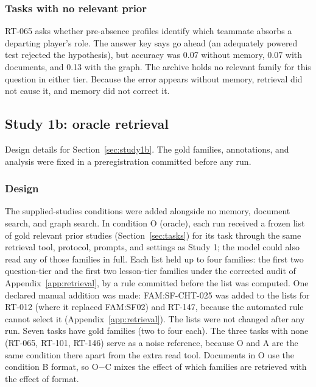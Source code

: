 \documentclass[11pt]{article}
\begin{document}
\subsubsection{Tasks with no relevant prior}

RT-065 asks whether pre-absence profiles identify which teammate absorbs a departing player's role. The answer key says go ahead (an adequately powered test rejected the hypothesis), but accuracy was 0.07 without memory, 0.07 with documents, and 0.13 with the graph. The archive holds no relevant family for this question in either tier. Because the error appears without memory, retrieval did not cause it, and memory did not correct it.


\subsection{Study 1b: oracle retrieval}

Design details for Section~\ref{sec:study1b}. The gold families, annotations, and analysis were fixed in a preregistration committed before any run.

\subsubsection{Design}

The supplied-studies conditions were added alongside no memory, document search, and graph search. In condition O (oracle), each run received a frozen list of gold relevant prior studies (Section~\ref{sec:tasks}) for its task through the same retrieval tool, protocol, prompts, and settings as Study 1; the model could also read any of those families in full. Each list held up to four families: the first two question-tier and the first two lesson-tier families under the corrected audit of Appendix~\ref{app:retrieval}, by a rule committed before the list was computed. One declared manual addition was made: FAM:SF-CHT-025 was added to the lists for RT-012 (where it replaced FAM:SF02) and RT-147, because the automated rule cannot select it (Appendix~\ref{app:retrieval}). The lists were not changed after any run. Seven tasks have gold families (two to four each). The three tasks with none (RT-065, RT-101, RT-146) serve as a noise reference, because O and A are the same condition there apart from the extra read tool. Documents in O use the condition B format, so O$-$C mixes the effect of which families are retrieved with the effect of format.
\end{document}

